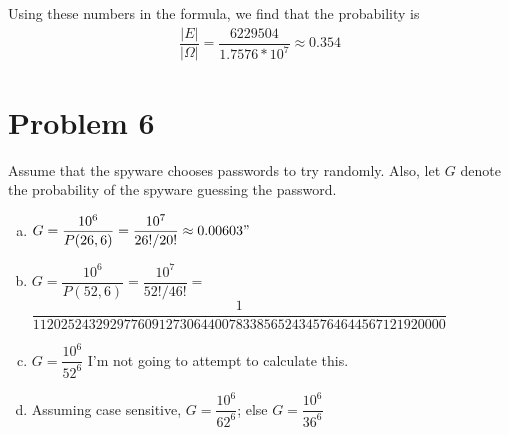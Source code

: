 \documentclass[11pt]{article}
\begin{document}
Using these numbers in the formula, we find that the probability is
	\begin{align*}
		\dfrac{|E|}{|\Omega|} = \dfrac{6229504}{1.7576 * 10^7} \approx 0 .354
	\end{align*}


\section*{Problem 6}
Assume that the spyware chooses passwords to try randomly. Also, let $G$ denote the probability of the spyware guessing the password.

\begin{enumerate}[(a)]
	\item $G = \dfrac{10^6}{P(26, 6)} = \dfrac{10^7}{26!/20!} \approx 0.00603"$
	\item $G = \dfrac{10^6}{P(52, 6)} = \dfrac{10^7}{52!/46!} =$\\
	$\dfrac{1}{11202524329297760912730644007833856524345764644567121920000}$
	\item $G = \dfrac{10^6}{52^6}$ I'm not going to attempt to calculate this.
	\item Assuming case sensitive, $G = \dfrac{10^6}{62^6}$; else $G = \dfrac{10^6}{36^6}$

	
\end{enumerate}
\end{document}
